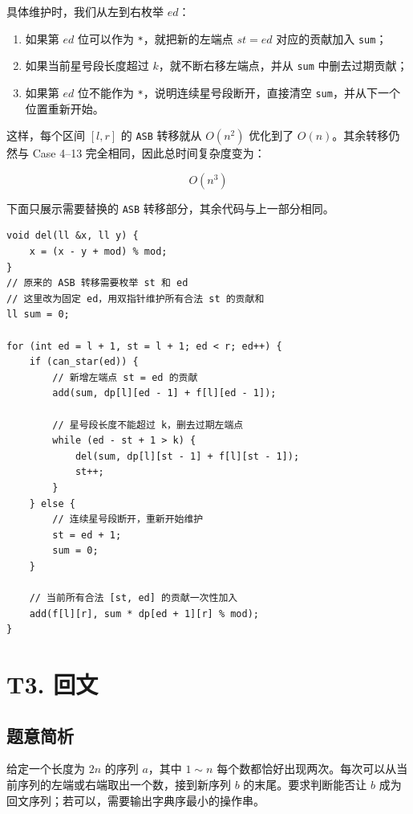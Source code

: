 \documentclass{book}
\newcommand{\code}[1]{\colorbox{codebg}{\texttt{#1}}}  %
\begin{document}
具体维护时，我们从左到右枚举 $ed$：

\begin{enumerate}[leftmargin=2em,itemsep=1pt,topsep=2pt,parsep=0pt,partopsep=0pt]
    \item 如果第 $ed$ 位可以作为 \code{*}，就把新的左端点 $st=ed$ 对应的贡献加入 \code{sum}；
    \item 如果当前星号段长度超过 $k$，就不断右移左端点，并从 \code{sum} 中删去过期贡献；
    \item 如果第 $ed$ 位不能作为 \code{*}，说明连续星号段断开，直接清空 \code{sum}，并从下一个位置重新开始。
\end{enumerate}

这样，每个区间 $[l,r]$ 的 \code{ASB} 转移就从 $O(n^2)$ 优化到了 $O(n)$。其余转移仍然与 Case 4--13 完全相同，因此总时间复杂度变为：

$$
O(n^3)
$$

\newpage
下面只展示需要替换的 \code{ASB} 转移部分，其余代码与上一部分相同。

\begin{lstlisting}[style = code]
void del(ll &x, ll y) {
    x = (x - y + mod) % mod;
}
// 原来的 ASB 转移需要枚举 st 和 ed
// 这里改为固定 ed，用双指针维护所有合法 st 的贡献和
ll sum = 0;

for (int ed = l + 1, st = l + 1; ed < r; ed++) {
    if (can_star(ed)) {
        // 新增左端点 st = ed 的贡献
        add(sum, dp[l][ed - 1] + f[l][ed - 1]);

        // 星号段长度不能超过 k，删去过期左端点
        while (ed - st + 1 > k) {
            del(sum, dp[l][st - 1] + f[l][st - 1]);
            st++;
        }
    } else {
        // 连续星号段断开，重新开始维护
        st = ed + 1;
        sum = 0;
    }

    // 当前所有合法 [st, ed] 的贡献一次性加入
    add(f[l][r], sum * dp[ed + 1][r] % mod);
}
\end{lstlisting}
\newpage
\section{T3. 回文}

\subsection{题意简析}

给定一个长度为 $2n$ 的序列 $a$，其中 $1\sim n$ 每个数都恰好出现两次。每次可以从当前序列的左端或右端取出一个数，接到新序列 $b$ 的末尾。要求判断能否让 $b$ 成为回文序列；若可以，需要输出字典序最小的操作串。
\end{document}
